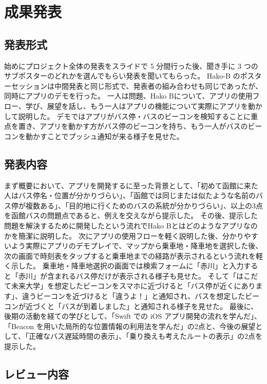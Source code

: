 \documentclass[openany,11pt,papersize]{jsbook}
\begin{document}


\chapter{成果発表}
\section{発表形式}
始めにプロジェクト全体の発表をスライドで 5 分間行った後、聞き手に 3 つのサブポスターのどれかを選んでもらい発表を聞いてもらった。
Hako-B のポスターセッションは中間発表と同じ形式で、発表者の組み合わせも同じであったが、同時にアプリのデモを行った。
一人は問題、Hako Bについて、アプリの使用フロー、学び、展望を話し、もう一人はアプリの機能について実際にアプリを動かして説明した。
デモではアプリがバス停・バスのビーコンを検知することに重点を置き、アプリを動かす方がバス停のビーコンを持ち、もう一人がバスのビーコンを動かすことでプッシュ通知が来る様子を見せた。


\section{発表内容}
まず概要において、アプリを開発するに至った背景として、「初めて函館に来た人はバス停名・位置が分かりづらい」、「函館では同じまたは似たような名前のバス停が複数ある」、「目的地に行くためのバスの系統が分かりづらい」、以上の3点を函館バスの問題点であると、例えを交えながら提示した。
その後、提示した問題を解決するために開発したという流れでHako Bとはどのようなアプリなのかを簡潔に説明した。
次にアプリの使用フローを軽く説明した後、分かりやすいよう実際にアプリのデモプレイで、マップから乗車地・降車地を選択した後、次の画面で時刻表をタップすると乗車地までの経路が表示されるという流れを軽く示した。
乗車地・降車地選択の画面では検索フォームに「赤川」と入力すると「赤川」が含まれるバス停だけが表示される様子も見せた。
そして「はこだて未来大学」を想定したビーコンをスマホに近づけると「バス停が近くにあります」、違うビーコンを近づけると「違うよ！」と通知され、バスを想定したビーコンが近づくと「バスが到着しました」と通知される様子を見せた。
最後に、後期の活動を経ての学びとして、「Swift での iOS アプリ開発の流れを学んだ」、「Beacon を用いた局所的な位置情報の利用法を学んだ」の2点と、今後の展望として、「正確なバス遅延時間の表示」、「乗り換えも考えたルートの表示」の2点を提示した。


\section{レビュー内容}
\end{document}
